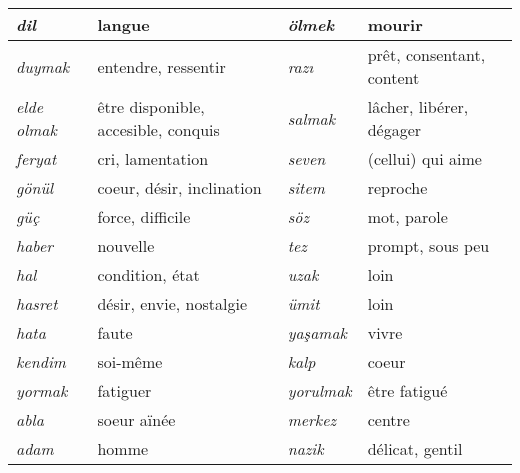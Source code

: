 \documentclass{cours}
\newcommand{\ch}{\c{s}}
\begin{document}
\begin{longtable}{>{\sl}m{}m{}|>{\sl}m{}m{}}
    \midrule
    dil              & langue                                               & ölmek           & mourir                                 \\
    \midrule
    duymak           & entendre, ressentir                                  & raz\i           & prêt, consentant, content              \\
    \midrule
    elde olmak       & être disponible, accesible, conquis                  & salmak          & lâcher, libérer, dégager               \\
    \midrule
    feryat           & cri, lamentation                                     & seven           & (cellui) qui aime                      \\
    \midrule
    gönül            & coeur, désir, inclination                            & sitem           & reproche                               \\
    \midrule
    güç              & force, difficile                                     & söz             & mot, parole                            \\
    \midrule
    haber            & nouvelle                                             & tez             & prompt, sous peu                       \\
    \midrule
    hal              & condition, état                                      & uzak            & loin                                   \\
    \midrule
    hasret           & désir, envie, nostalgie                              & ümit            & loin                                   \\
    \midrule
    hata             & faute                                                & ya\ch amak      & vivre                                  \\
    \midrule
    kendim           & soi-même                                             & kalp            & coeur                                  \\
    \midrule
    yormak           & fatiguer                                             & yorulmak        & être fatigué                           \\
    \midrule
    abla             & soeur aïnée                                          & merkez          & centre                                 \\
    \midrule
    adam             & homme                                                & nazik           & délicat, gentil                        \\

\end{longtable}
\end{document}
